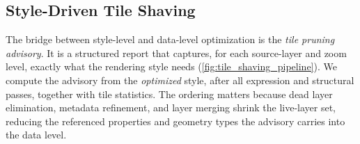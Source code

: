 \subsection{Style-Driven Tile Shaving}\label{sec:methods:shaving}

The bridge between style-level and data-level optimization is the \emph{tile pruning advisory}.
It is a structured report that captures, for each source-layer and zoom level, exactly what the rendering style needs (\cref{fig:tile_shaving_pipeline}).
We compute the advisory from the \emph{optimized} style, after all expression and structural passes, together with tile statistics.
The ordering matters because dead layer elimination, metadata refinement, and layer merging shrink the live-layer set, reducing the referenced properties and geometry types the advisory carries into the data level.

